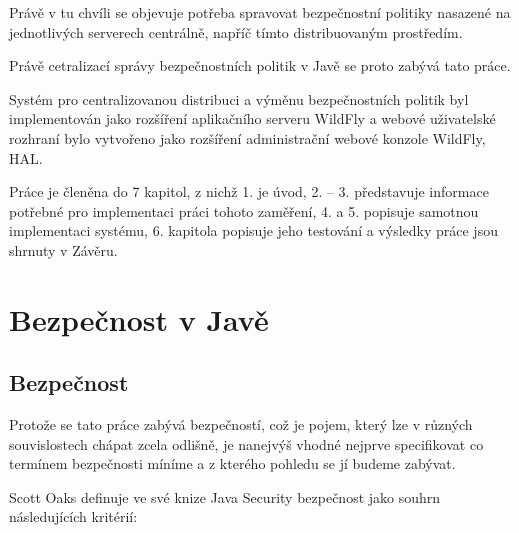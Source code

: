 Právě v tu chvíli se objevuje potřeba spravovat bezpečnostní politiky nasazené na jednotlivých serverech centrálně, napříč tímto distribuovaným prostředím.

Právě cetralizací správy bezpečnostních politik v Javě se proto zabývá tato práce.

Systém pro centralizovanou distribuci a výměnu bezpečnostních politik byl implementován jako rozšíření aplikačního serveru
WildFly a webové uživatelské rozhraní bylo vytvořeno jako rozšíření administrační webové konzole WildFly, HAL.

Práce je členěna do 7 kapitol, z nichž 1. je úvod, 2. -- 3. představuje informace potřebné pro implementaci práci tohoto zaměření,
4. a 5. popisuje samotnou implementaci systému, 6. kapitola popisuje jeho testování a výsledky práce jsou shrnuty v Závěru.

\chapter{Bezpečnost v Javě} \label{teoretickyUvod}

\section{Bezpečnost}

Protože se tato práce zabývá bezpečností, což je pojem, který lze v různých souvislostech chápat zcela odlišně, je nanejvýš vhodné nejprve specifikovat co termínem bezpečnosti míníme a z kterého pohledu se jí budeme zabývat.

Scott Oaks definuje ve své knize Java Security bezpečnost jako souhrn následujících kritérií: \cite[1.1]{oaks}

